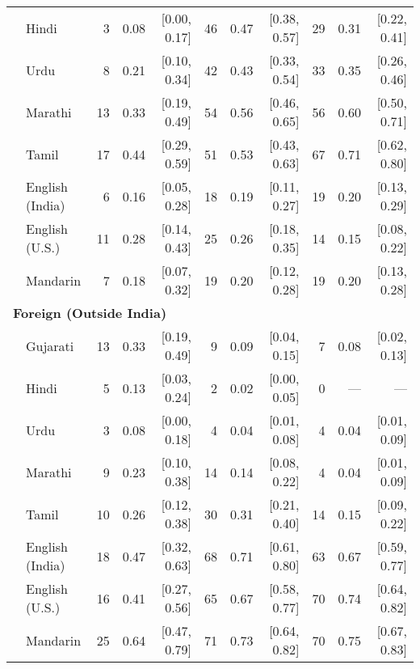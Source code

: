 \begin{table}[h!]
\begin{footnotesize}
\begin{tabular}{p{.1in}lrrrrrrrrr}
 & Hindi & 3 & 0.08 & [0.00, 0.17] & 46 & 0.47 & [0.38, 0.57] & 29 & 0.31 & [0.22, 0.41]\\

 & Urdu & 8 & 0.21 & [0.10, 0.34] & 42 & 0.43 & [0.33, 0.54] & 33 & 0.35 & [0.26, 0.46]\\

 & Marathi & 13 & 0.33 & [0.19, 0.49] & 54 & 0.56 & [0.46, 0.65] & 56 & 0.60 & [0.50, 0.71]\\

 & Tamil & 17 & 0.44 & [0.29, 0.59] & 51 & 0.53 & [0.43, 0.63] & 67 & 0.71 & [0.62, 0.80]\\

 & English (India) & 6 & 0.16 & [0.05, 0.28] & 18 & 0.19 & [0.11, 0.27] & 19 & 0.20 & [0.13, 0.29]\\

 & English (U.S.) & 11 & 0.28 & [0.14, 0.43] & 25 & 0.26 & [0.18, 0.35] & 14 & 0.15 & [0.08, 0.22]\\

& Mandarin & 7 & 0.18 & [0.07, 0.32] & 19 & 0.20 & [0.12, 0.28] & 19 & 0.20 & [0.13, 0.28]\\

\midrule
\multicolumn{11}{l}{\textbf{Foreign (Outside India)}}\\
& Gujarati & 13 & 0.33 & [0.19, 0.49] & 9 & 0.09 & [0.04, 0.15] & 7 & 0.08 & [0.02, 0.13]\\

 & Hindi & 5 & 0.13 & [0.03, 0.24] & 2 & 0.02 & [0.00, 0.05] & 0 & --- & ---\\

 & Urdu & 3 & 0.08 & [0.00, 0.18] & 4 & 0.04 & [0.01, 0.08] & 4 & 0.04 & [0.01, 0.09]\\

 & Marathi & 9 & 0.23 & [0.10, 0.38] & 14 & 0.14 & [0.08, 0.22] & 4 & 0.04 & [0.01, 0.09]\\

 & Tamil & 10 & 0.26 & [0.12, 0.38] & 30 & 0.31 & [0.21, 0.40] & 14 & 0.15 & [0.09, 0.22]\\

 & English (India) & 18 & 0.47 & [0.32, 0.63] & 68 & 0.71 & [0.61, 0.80] & 63 & 0.67 & [0.59, 0.77]\\

 & English (U.S.) & 16 & 0.41 & [0.27, 0.56] & 65 & 0.67 & [0.58, 0.77] & 70 & 0.74 & [0.64, 0.82]\\

& Mandarin & 25 & 0.64 & [0.47, 0.79] & 71 & 0.73 & [0.64, 0.82] & 70 & 0.75 & [0.67, 0.83]\\


\end{tabular}
\end{footnotesize}
\end{table}
